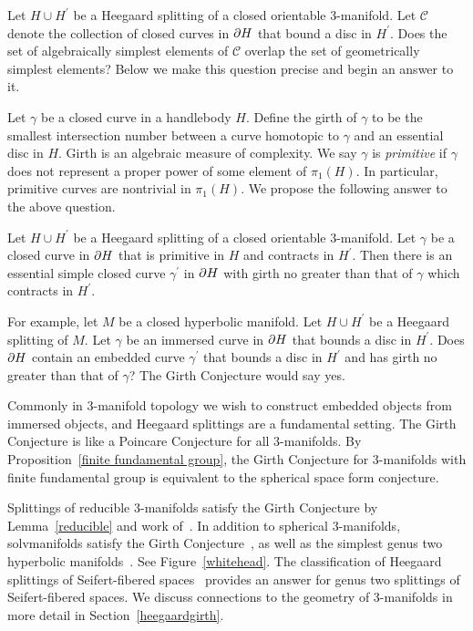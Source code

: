 Let $H\cup H^\prime$ be a Heegaard splitting of a closed orientable 3-manifold.    Let $\mathcal{C}$ denote the collection of closed curves in $\partial H$ that bound a disc in $H^{\prime}$.  Does the set of algebraically simplest elements of $\mathcal{C}$ overlap the set of geometrically simplest elements?  Below we make this question precise and begin an answer to it.

Let $\gamma$ be a closed curve in a handlebody $H$.  Define the girth of $\gamma$ to be the smallest intersection number between a curve homotopic to $\gamma$ and an essential disc in $H$.  Girth is an algebraic measure of complexity.  We say $\gamma$ is \emph{primitive} if $\gamma$ does not represent a proper power of some element of $\pi_{1}(H)$.  In particular, primitive curves are nontrivial in $\pi_{1}(H)$.  We propose the following answer to the above question.

\begin{girth conjecture}
Let $H\cup H^\prime$ be a Heegaard splitting of a closed orientable 
3-manifold.  Let $\gamma$ be a closed curve in $\partial H$ that is
primitive in $H$ and contracts in $H^\prime$.  Then there is an essential simple closed curve $\gamma^{\prime}$ in $\partial H$ with girth no greater than that of $\gamma$ which contracts in $H^\prime$.
\end{girth conjecture}

For example, let $M$ be a closed hyperbolic manifold.  Let $H\cup H^{\prime}$ be a Heegaard splitting of $M$.  Let $\gamma$ be an immersed curve in $\partial H$ that bounds a disc in $H^{\prime}$.  Does $\partial H$ contain an embedded curve $\gamma^{\prime}$ that bounds a disc in $H^{\prime}$ and has girth no greater than that of $\gamma$?  The Girth Conjecture would say yes.

Commonly in 3-manifold topology we wish to construct embedded objects from immersed objects, and Heegaard splittings are a fundamental setting.  The Girth Conjecture is like a Poincare Conjecture for all 3-manifolds.  By Proposition~\ref{finite fundamental group}, the Girth Conjecture for 3-manifolds with finite fundamental group is equivalent to the spherical space form conjecture.

Splittings of reducible 3-manifolds satisfy the Girth Conjecture by Lemma~\ref{reducible} and work of~\cite{Ha}.  In addition to spherical 3-manifolds, solvmanifolds satisfy the Girth Conjecture~\cite{Je1}, as well as the simplest genus two hyperbolic manifolds~\cite{Je2}.  See Figure~\ref{whitehead}.  The classification of Heegaard splittings of Seifert-fibered spaces~\cite{MS} provides an answer for genus two splittings of Seifert-fibered spaces.  We discuss connections to the geometry of 3-manifolds in more detail in Section~\ref{heegaardgirth}.

